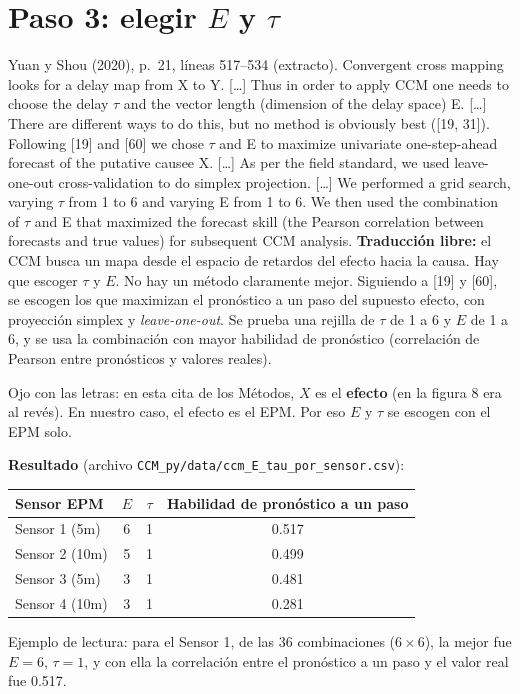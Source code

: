 \documentclass[11pt,openany]{book}
\newcommand{\archivo}[1]{\texttt{\small #1}}
\begin{document}
\section{Paso 3: elegir $E$ y $\tau$}

\begin{cita}{Yuan y Shou (2020), p.~21, líneas 517--534 (extracto).}
Convergent cross mapping looks for a delay map from X to Y. [\dots] Thus in order to apply CCM one needs to choose the delay $\tau$ and the vector length (dimension of the delay space) E. [\dots] There are different ways to do this, but no method is obviously best ([19, 31]). Following [19] and [60] we chose $\tau$ and E to maximize univariate one-step-ahead forecast of the putative causee X. [\dots] As per the field standard, we used leave-one-out cross-validation to do simplex projection. [\dots] We performed a grid search, varying $\tau$ from 1 to 6 and varying E from 1 to 6. We then used the combination of $\tau$ and E that maximized the forecast skill (the Pearson correlation between forecasts and true values) for subsequent CCM analysis.
\tcblower
\textbf{Traducción libre:} el CCM busca un mapa desde el espacio de retardos del efecto hacia la causa. Hay que escoger $\tau$ y $E$. No hay un método claramente mejor. Siguiendo a [19] y [60], se escogen los que maximizan el pronóstico a un paso del supuesto efecto, con proyección simplex y \emph{leave-one-out}. Se prueba una rejilla de $\tau$ de 1 a 6 y $E$ de 1 a 6, y se usa la combinación con mayor habilidad de pronóstico (correlación de Pearson entre pronósticos y valores reales).
\end{cita}

Ojo con las letras: en esta cita de los Métodos, $X$ es el \textbf{efecto} (en la figura 8 era al revés). En nuestro caso, el efecto es el EPM. Por eso $E$ y $\tau$ se escogen con el EPM solo.

\textbf{Resultado} (archivo \archivo{CCM\_py/data/ccm\_E\_tau\_por\_sensor.csv}):
\begin{center}\small
\begin{tabular}{lccc}
\toprule
Sensor EPM & $E$ & $\tau$ & Habilidad de pronóstico a un paso \\
\midrule
Sensor 1 (5m) & 6 & 1 & 0.517 \\
Sensor 2 (10m) & 5 & 1 & 0.499 \\
Sensor 3 (5m) & 3 & 1 & 0.481 \\
Sensor 4 (10m) & 3 & 1 & 0.281 \\
\bottomrule
\end{tabular}
\end{center}
Ejemplo de lectura: para el Sensor 1, de las 36 combinaciones ($6 \times 6$), la mejor fue $E = 6$, $\tau = 1$, y con ella la correlación entre el pronóstico a un paso y el valor real fue 0.517.
\end{document}

